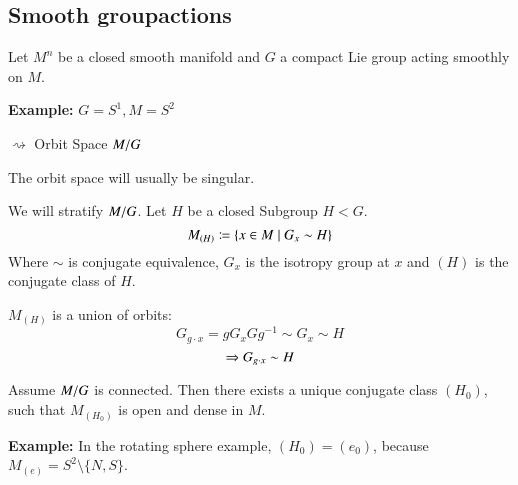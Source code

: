 \subsection*{Smooth groupactions}

Let $M^n$ be a closed smooth manifold and $G$ a compact Lie group acting smoothly on $M$.

\textbf{Example:} $G = S^1, M = S^2$ %

$\rightsquigarrow$ Orbit Space $M / G$

The orbit space will usually be singular.

We will stratify $M / G$. Let $H$ be a closed Subgroup $H < G$.
\[ M_{(H)} \coloneqq \{ x \in M \mid G_x \sim H \} \]
Where $\sim$ is conjugate equivalence, $G_x$ is the isotropy group at $x$ and $(H)$ is the conjugate class of $H$.

$M_{(H)}$ is a union of orbits:
\[ G_{g\cdot x} = gG_xGg^{-1} \sim G_x \sim H \]
\[ \Rightarrow G_{g\cdot x} \sim H \]
\begin{proposition}
    Assume $M / G$ is connected. Then there exists a unique conjugate class $(H_0)$, such that $M_{(H_0)}$ is open and dense in $M$.
\end{proposition}

\textbf{Example:} In the rotating sphere example, $(H_0) = (e_0)$, because $M_{(e)} = S^2 \setminus \{N,S\}$.

